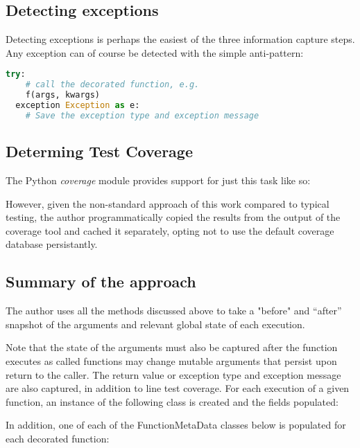 \subsection{Detecting exceptions}\label{sec:approach-internal-3}
Detecting exceptions is perhaps the easiest of the three information capture steps.
Any exception can of course be detected with the simple anti-pattern:

\begin{lstlisting}[language=Python, caption={Catching and recording exceptions}]
  try:
    # call the decorated function, e.g.
    f(args, kwargs)
  exception Exception as e:
    # Save the exception type and exception message
  \end{lstlisting}

\subsection{Determing Test Coverage}\label{sec:approach-internal-4}
The Python \textit{coverage}
module provides support for just this task like so:



However, given the non-standard
approach of this work compared to typical testing, the author programmatically
copied the results from the output of the coverage tool and cached it separately, 
opting not to use the default coverage database persistantly.

\subsection{Summary of the approach}\label{sec:approach-internal-5}

The author uses all the methods discussed above to take a "before" and “after” 
snapshot of the arguments and relevant global state of each execution. 

Note that the state of the arguments must also be captured after the function 
executes as called functions may change mutable arguments that persist upon 
return to the caller. The return value or exception type and exception message
 are also captured, in addition to line test coverage. 
 For each execution of a given function, an instance of the 
 following class is created and the fields populated:


In addition, one of each of the FunctionMetaData classes below is populated for each decorated function:

